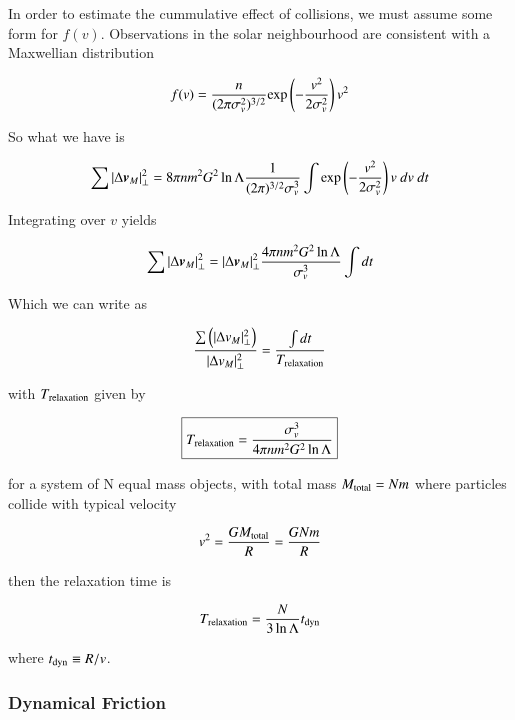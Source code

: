 In order to estimate the cummulative effect of collisions, we must assume some form for $f(v)$. Observations in the solar neighbourhood are consistent with a Maxwellian distribution

\begin{equation}
f(v) = \frac{n}{(2\pi \sigma_v^2)^{3/2}} {\rm exp}\left(-\frac{v^2}{2\sigma_v^2}\right)v^2
\end{equation}

So what we have is 

\begin{equation}
\sum |\Delta {\boldsymbol{v}}_{M}|_\perp^2  = 8\pi nm^2 G^2 \ln \Lambda \frac{1}{(2\pi)^{3/2} \sigma_v^3} \int  {\rm exp}\left(-\frac{v^2}{2\sigma_v^2}\right)v \ dv \ dt
\end{equation}

Integrating over $v$ yields 

\begin{equation}
\sum |\Delta {\boldsymbol{v}}_{M}|_\perp^2  = |\Delta {\boldsymbol{v}}_{M}|_\perp^2 \frac{4\pi n m^2 G^2 \ln \Lambda}{\sigma_v^3} \int dt
\end{equation}


Which we can write as 

\begin{equation}
\frac{\sum \left(|\Delta v_{M}|_\perp^2\right)}{|\Delta v_{M}|_\perp^2} = \frac{\int dt}{T_{\rm relaxation}}
\end{equation}


with $T_{\rm relaxation}$ given by 

\begin{equation}
\boxed{
T_{\rm relaxation} = \frac{\sigma_v^3}{4\pi n m^2 G^2 \ln \Lambda}
}
\end{equation}


for a system of N equal mass objects, with total mass $M_{\rm total} = Nm$ where particles collide with typical velocity 

\begin{equation}
v^2 = \frac{GM_{\rm total}}{R} = \frac{G N m}{R}
\end{equation}

then the relaxation time is 

\begin{equation}
T_{\rm relaxation} = \frac{N}{3\ln \Lambda} t_{\rm dyn}
\end{equation}

where $t_{\rm dyn} \equiv R/v$. 

\subsubsection{Dynamical Friction}

